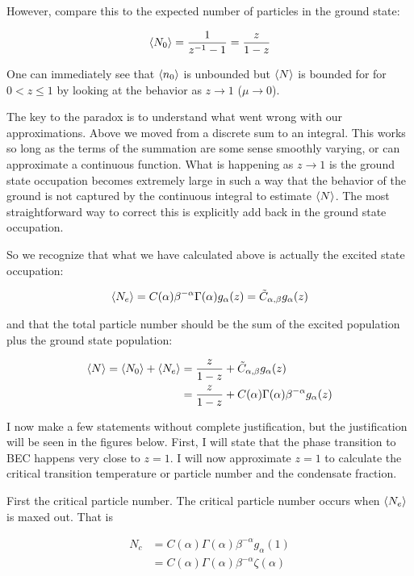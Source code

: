 \documentclass[12pt]{article}
\begin{document}
However, compare this to the expected number of particles in the ground state:

\begin{align}
\braket{N_0} = \frac{1}{z^{-1} -1} = \frac{z}{1 -z}
\end{align}

One can immediately see that $\braket{n_0}$ is unbounded but $\Braket{N}$ is bounded for for $0<z\le1$ by looking at the behavior as $z\rightarrow 1$ ($\mu \rightarrow 0$). 

The key to the paradox is to understand what went wrong with our approximations. Above we moved from a discrete sum to an integral. This works so long as the terms of the summation are some sense smoothly varying, or can approximate a continuous function. What is happening as $z\rightarrow 1$ is the ground state occupation becomes extremely large in such a way that the behavior of the ground is not captured by the continuous integral to estimate $\Braket{N}$. The most straightforward way to correct this is explicitly add back in the ground state occupation.

So we recognize that what we have calculated above is actually the excited state occupation:

\begin{align}
\Braket{N_e} = C(\alpha)\beta^{-\alpha}\Gamma(\alpha)g_{\alpha}(z) = \tilde{C}_{\alpha,\beta}g_{\alpha}(z)
\end{align}

and that the total particle number should be the sum of the excited population plus the ground state population:

\begin{align}
\Braket{N} = \Braket{N_0} + \Braket{N_e} &= \frac{z}{1-z} + \tilde{C}_{\alpha,\beta}g_{\alpha}(z)\\
&= \frac{z}{1-z} + C(\alpha)\Gamma(\alpha)\beta^{-\alpha}g_{\alpha}(z)
\end{align}

I now make a few statements without complete justification, but the justification will be seen in the figures below. First, I will state that the phase transition to BEC happens very close to $z=1$. I will now approximate $z=1$ to calculate the critical transition temperature or particle number and the condensate fraction.

First the critical particle number. The critical particle number occurs when $\Braket{N_e}$ is maxed out. That is

\begin{align}
N_c &= C(\alpha)\Gamma(\alpha)\beta^{-\alpha}g_{\alpha}(1)\\
&= C(\alpha)\Gamma(\alpha)\beta^{-\alpha}\zeta(\alpha)
\end{align}
\end{document}
